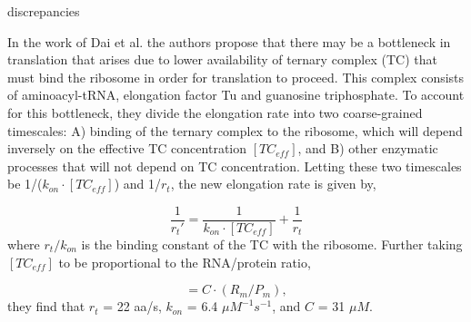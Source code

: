 discrepancies \documentclass[11pt, letterpaper]{article}
\begin{document}
%
%


In the work of Dai et al. the authors propose that there may be a bottleneck in
translation that arises due to lower  availability of ternary complex (TC)
that must bind the ribosome in order for translation to proceed. This complex
consists of aminoacyl-tRNA, elongation factor Tu and guanosine triphosphate.
To account for this bottleneck, they divide the elongation rate into two
coarse-grained timescales: A) binding of the ternary complex to the ribosome,
which will depend inversely on the effective TC concentration $[TC_{eff}]$, and
B) other enzymatic processes that will not depend
on TC concentration. Letting these two timescales be 1/($k_{on} \cdot
[TC_{eff}]$) and 1/$r_t$, the new elongation rate is given by,

\begin{equation}
\frac{1}{r_t'} = \frac{1}{k_{on} \cdot [TC_{eff}]} + \frac{1}{r_t}
\label{eq:rate_dai}
\end{equation}
where $r_t/k_{on}$ is the binding constant of the TC with the ribosome. Further
taking $[TC_{eff}]$ to be proportional to the RNA/protein ratio,

\begin{equation}
[TC_{eff}] = C \cdot (R_m/P_m),
\label{eq:elong_rate}
\end{equation}
they find that  $r_t$ = 22 aa/s, $k_{on}$ = 6.4 $\mu M^{-1}s^{-1}$, and
$C$ = 31 $\mu M$.
\end{document}
